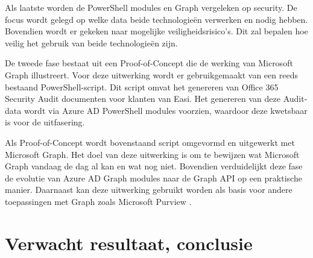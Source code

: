 Als laatste worden de PowerShell modules en Graph vergeleken op security. De focus wordt gelegd op welke data beide technologieën verwerken en nodig hebben. Bovendien wordt er gekeken naar mogelijke veiligheidsrisico's. Dit zal bepalen hoe veilig het gebruik van beide technologieën zijn.

De tweede fase bestaat uit een Proof-of-Concept die de werking van Microsoft Graph illustreert. Voor deze uitwerking wordt er gebruikgemaakt van een reeds bestaand PowerShell-script. Dit script omvat het genereren van Office 365 Security Audit documenten voor klanten van Easi. Het genereren van deze Audit-data wordt via Azure AD PowerShell modules voorzien, waardoor deze kwetsbaar is voor de uitfasering. 

Als Proof-of-Concept wordt bovenstaand script omgevormd en uitgewerkt met Microsoft Graph. Het doel van deze uitwerking is om te bewijzen wat Microsoft Graph vandaag de dag al kan en wat nog niet. Bovendien verduidelijkt deze fase de evolutie van Azure AD Graph modules naar de Graph API op een praktische manier. Daarnaast kan deze uitwerking gebruikt worden als basis voor andere toepassingen met Graph zoals Microsoft Purview \autocite{Microsoft2023a}. 

\section{Verwacht resultaat, conclusie}%
\label{sec:verwachte_resultaten}

